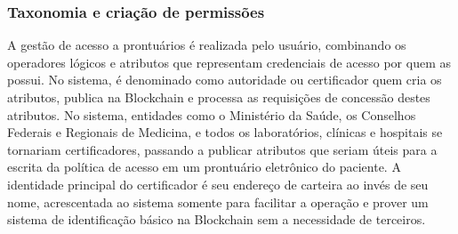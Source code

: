 \documentclass[a4paper,11pt]{article}
\begin{document}
\subsubsection{Taxonomia e criação de permissões}
\label{sec:sub:taxonomia-permissoes}

A gestão de acesso a prontuários é realizada pelo usuário, combinando os operadores lógicos e atributos que representam credenciais de acesso por quem as possui.
No sistema, é denominado como autoridade ou certificador quem cria os atributos, publica na Blockchain e processa as requisições de concessão destes atributos.
No sistema, entidades como o Ministério da Saúde, os Conselhos Federais e Regionais de Medicina, e todos os laboratórios, clínicas e hospitais se tornariam certificadores, passando a publicar atributos que seriam úteis para a escrita da política de acesso em um prontuário eletrônico do paciente.
A identidade principal do certificador é seu endereço de carteira ao invés de seu nome, acrescentada ao sistema somente para facilitar a operação e prover um sistema de identificação básico na Blockchain sem a necessidade de terceiros. %

\end{document}
